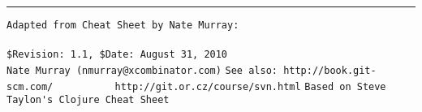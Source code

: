 \documentclass[footexclude,twocolumn,DIV25,fontsize=10pt]{scrreprt}
\begin{document}
\begin{flushright}
\footnotesize
\rule{0.7\linewidth}{0.25pt}
\verb!Adapted from Cheat Sheet by Nate Murray:          ! \\
\verb!! \\
\verb!$Revision: 1.1, $Date: August 31, 2010!\\
\verb!Nate Murray (nmurray@xcombinator.com)!
\verb!See also: http://book.git-scm.com/!
\verb!          http://git.or.cz/course/svn.html!
\verb!Based on Steve Taylon's Clojure Cheat Sheet!
\end{flushright}

%
%
\end{document}
